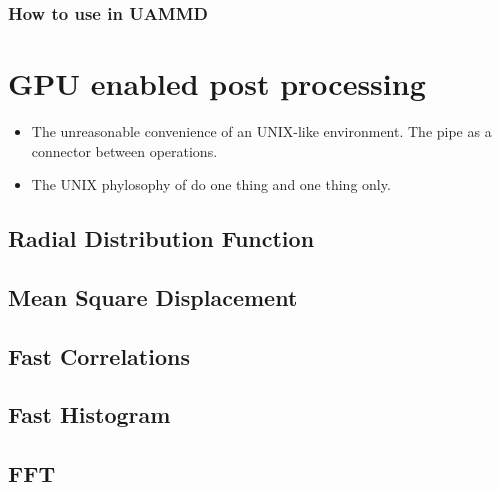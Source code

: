 \documentclass[ twoside,openright,titlepage,numbers=noenddot,%
headinclude,footinclude,cleardoublepage=empty,abstract=on,
BCOR=5mm,paper=a4,fontsize=11pt, dvipsnames
]{scrreprt}
\begin{document}
\section{How to use in UAMMD}


\newpage
\cleardoublepage
{}
\part{GPU enabled post processing}\label{pt:tools}

\begin{itemize}
\item The unreasonable convenience of an UNIX-like environment. The pipe as a connector between operations.
\item The UNIX phylosophy of do one thing and one thing only.
\end{itemize}

\chapter{Radial Distribution Function}


\chapter{Mean Square Displacement}
\chapter{Fast Correlations}
\chapter{Fast Histogram}
\chapter{FFT}
\end{document}
